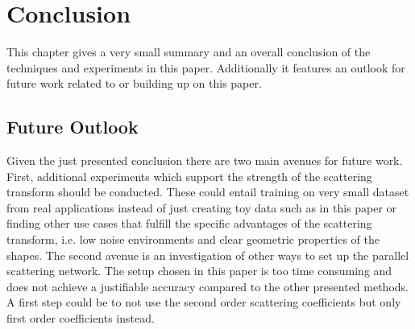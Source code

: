 \chapter{Conclusion}
\label{chap:conclusion}

This chapter gives a very small summary and an overall conclusion of the techniques and experiments in this paper. Additionally it features an outlook for future work related to or building up on this paper. \\


\section{Future Outlook}

Given the just presented conclusion there are two main avenues for future work. First, additional experiments which support the strength of the scattering transform should be conducted. These could entail training on very small dataset from real applications instead of just creating toy data such as in this paper or finding other use cases that fulfill the specific advantages of the scattering transform, i.e. low noise environments and clear geometric properties of the shapes. The second avenue is an investigation of other ways to set up the parallel scattering network. The setup chosen in this paper is too time consuming and does not achieve a justifiable accuracy compared to the other presented methods. A first step could be to not use the second order scattering coefficients but only first order coefficients instead. 